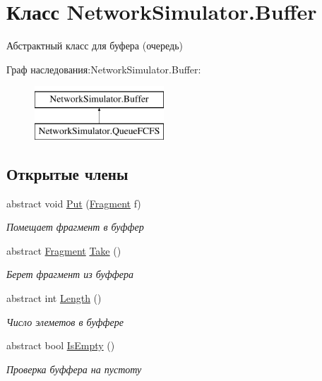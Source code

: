 \hypertarget{class_network_simulator_1_1_buffer}{}\section{Класс Network\+Simulator.\+Buffer}
\label{class_network_simulator_1_1_buffer}


Абстрактный класс для буфера (очередь)  


Граф наследования\+:Network\+Simulator.\+Buffer\+:\begin{figure}[H]
\begin{center}
\leavevmode
\includegraphics[height=2.000000cm]{class_network_simulator_1_1_buffer}
\end{center}
\end{figure}
\subsection*{Открытые члены}
\begin{DoxyCompactItemize}
\item 
abstract void \hyperlink{class_network_simulator_1_1_buffer_acc9891009aed36c04a04796e24cc62a5}{Put} (\hyperlink{class_network_simulator_1_1_fragment}{Fragment} f)
\begin{DoxyCompactList}\small\item\em Помещает фрагмент в буффер \end{DoxyCompactList}\item 
abstract \hyperlink{class_network_simulator_1_1_fragment}{Fragment} \hyperlink{class_network_simulator_1_1_buffer_abb36ad86bbf0f02e0905388ab07e041d}{Take} ()
\begin{DoxyCompactList}\small\item\em Берет фрагмент из буффера \end{DoxyCompactList}\item 
abstract int \hyperlink{class_network_simulator_1_1_buffer_ad8935513aaa3111b032d3b36cde5b663}{Length} ()
\begin{DoxyCompactList}\small\item\em Число элеметов в буффере \end{DoxyCompactList}\item 
abstract bool \hyperlink{class_network_simulator_1_1_buffer_afbd910f1f775e7ee212017c92e72a09f}{Is\+Empty} ()
\begin{DoxyCompactList}\small\item\em Проверка буффера на пустоту \end{DoxyCompactList}\end{DoxyCompactItemize}


